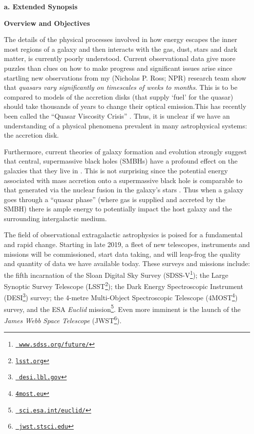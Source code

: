 \documentclass[oneside, a4paper, onecolumn, 11pt]{article}
\begin{document}
\vspace{-16pt}

\smallskip
\smallskip
\noindent
{\bf{\textcolor{Cerulean}{a. Extended Synopsis}}} 
\vspace{6pt}

\noindent
\large
{\bf{\textcolor{Cerulean}{Overview and Objectives}}}
\normalsize

\smallskip
\smallskip
\noindent
The details of the physical processes involved in how 
energy escapes the inner most regions of a galaxy and then interacts
with the gas, dust, stars and dark matter, is currently poorly
understood. Current observational data give more puzzles than
clues on how to make progress and significant issues arise since
startling new observations from my (Nicholas P. Ross; NPR) research
team \citep{MacLeod2016, Ross2018} show that {\it quasars vary
significantly on timescales of weeks to months}. This is to be compared to 
models of the accretion
disks (that supply `fuel' for the quasar) should take thousands of
years to change their optical emission.This has recently been called
the ``Quasar Viscosity Crisis'' \citep[e.g., ][]{Lawrence2018}. Thus,
it is unclear if we have an understanding of a physical phenomena
prevalent in many astrophysical systems: the accretion disk.

\smallskip
\smallskip
\noindent
Furthermore, current theories of galaxy formation and evolution strongly suggest
that central, supermassive black holes (SMBHs) have a profound effect
on the galaxies that they live in \citep[e.g., ][]{KormendyHo2013}.
This is not surprising since the potential energy associated with mass
accretion onto a supermassive black hole is comparable to that
generated via the nuclear fusion in the galaxy's stars \citep[see
e.g. ][]{Fabian2012}. Thus when a galaxy goes through a ``quasar
phase'' (where gas is supplied and accreted by the SMBH) there is
ample energy to potentially impact the host galaxy and the surrounding
intergalactic medium.


\smallskip
\smallskip
\noindent
The field of observational extragalactic astrophysics is poised for a
fundamental and rapid change. Starting in late 2019, a fleet of new
telescopes, instruments and missions will be commissioned, start data
taking, and will leap-frog the quality and quantity of data we have
available today. These surveys and missions include: the fifth
incarnation of the Sloan Digital Sky Survey
(SDSS-V\footnote{\href{www.sdss.org/future/}{{\tt
www.sdss.org/future/}}}); the Large Synoptic Survey Telescope
(LSST\footnote{\href{lsst.org}{{\tt lsst.org}}}); the Dark Energy
Spectroscopic Instrument (DESI\footnote{\href{desi.lbl.gov}{{\tt
desi.lbl.gov}}}) survey; the 4-metre Multi-Object Spectroscopic
Telescope (4MOST\footnote{\href{4most.eu}{{\tt 4most.eu}}}) survey,
and the ESA {\it Euclid}
mission\footnote{\href{sci.esa.int/euclid/}{{\tt
sci.esa.int/euclid/}}}. Even more imminent is the launch of the {\it
James Webb Space Telescope} (JWST\footnote{\href{jwst.stsci.edu}{{\tt
jwst.stsci.edu}}}).
\end{document}
